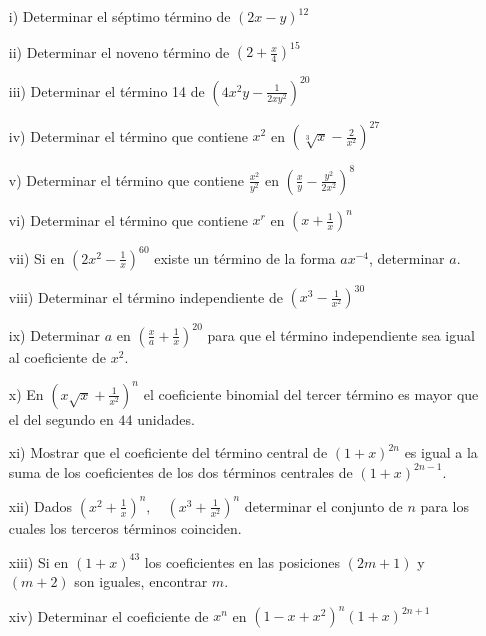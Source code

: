 \begin{Ejer}
\begin{itemize}
\item[i) ] Determinar el s\'eptimo t\'ermino de $(2x-y)^{12}$

\item[ii) ] Determinar el noveno t\'ermino de $\left(2+\frac{x}{4}\right)^{15}$

\item[iii) ] Determinar el t\'ermino 14 de $\left(4x^2y-\frac{1}{2xy^2}\right)^{20}$

\item[iv) ] Determinar el t\'ermino que contiene $x^2$ en $\left(\sqrt[3]{x}-\frac{2}{x^2}\right)^{27}$

\item[v) ] Determinar el t\'ermino que contiene $\frac{x^2}{y^2}$ en $\left(\frac{x}{y}-\frac{y^2}{2x^2}\right)^8$

\item[vi) ] Determinar el t\'ermino que contiene $x^r$ en $\left(x+\frac{1}{x}\right)^n$

\item[vii) ] Si en $(2x^2-\frac{1}{x})^{60}$ existe un t\'ermino de la forma $ax^{-4}$,
determinar $a$.

\item[viii) ] Determinar el t\'ermino independiente de $(x^3-\frac{1}{x^2})^{30}$

\item[ix) ] Determinar $a$ en $\left(\frac{x}{a}+\frac{1}{x}\right)^{20}$ para que el t\'ermino independiente sea igual al coeficiente de $x^2$.

\item[x) ] En $(x\sqrt{x}+\frac{1}{x^2})^n$ el coeficiente binomial del tercer t\'ermino es mayor
que el del segundo en $44$ unidades.

\item[xi) ] Mostrar que el coeficiente del t\'ermino central de $(1+x)^{2n}$ es igual a la suma de los coeficientes de los dos t\'erminos centrales de $(1+x)^{2n-1}$.

\item[xii) ] Dados $(x^2+\frac{1}{x})^n,\quad(x^3+\frac{1}{x^2})^n$ determinar el conjunto de $n$ para los cuales los terceros t\'erminos coinciden.

\item[xiii) ] Si en $(1+x)^{43}$ los coeficientes en las posiciones $(2m+1)$ y $(m+2)$ son iguales, encontrar $m$.

\item[xiv) ] Determinar el coeficiente de $x^n$ en $(1-x+x^2)^n(1+x)^{2n+1}$


\end{itemize}
\end{Ejer}
